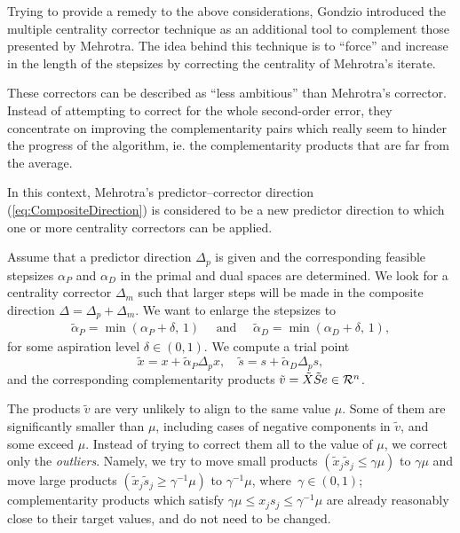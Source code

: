 Trying to provide a remedy to the above considerations, Gondzio 
\cite{Gondzio96} introduced the multiple centrality corrector technique 
as an additional tool to complement those presented by Mehrotra. 
The idea behind this technique is to ``force'' and increase in the 
length of the stepsizes by correcting the centrality of Mehrotra's 
iterate.

These correctors can be described as ``less ambitious'' than Mehrotra's
corrector. Instead of attempting to correct for the whole second-order error,
they concentrate on improving the complementarity pairs which really seem 
to hinder the progress of the algorithm, ie. the complementarity products 
that are far from the average.



In this context, Mehrotra's predictor--corrector direction 
(\ref{eq:CompositeDirection}) is considered to be a new predictor direction
to which one or more centrality correctors can be applied. 

Assume that a predictor direction $\Delta_p$ is given and the corresponding
feasible stepsizes $\alpha_{P}$ and $\alpha_{D}$ 
in the primal and dual spaces are 
determined. We look for a centrality corrector $\Delta_m$ such that larger
steps will be made in the composite direction $\Delta = \Delta_p + \Delta_m$.
We want to enlarge the stepsizes to 
%
\begin{eqnarray*} 
   \tilde{\alpha}_{P} = \min(\alpha_{P} \! + \! \delta, \,1) 
   \quad \mbox{ and } \quad
   \tilde{\alpha}_{D} = \min(\alpha_{D} \! + \! \delta, \,1), 
\end{eqnarray*}
%
for some aspiration level $\delta \in(0,1)$. We compute a trial point
%
\[
  \tilde{x} = x + \tilde{\alpha}_{P} \Delta_{p} x, \quad 
  \tilde{s} = s + \tilde{\alpha}_{D} \Delta_{p} s,
\]
%
and the corresponding complementarity products 
$\tilde v = \tilde X \tilde S e \in {\cal R}^{n}$.

The products $\tilde v$ are very unlikely to align to the same value $\mu$.
Some of them are significantly smaller than $\mu$, 
including cases of negative components in $\tilde v$, 
and some exceed $\mu$. Instead of trying to correct 
them all to the value of $\mu$, we correct only the {\it outliers}. 
Namely, we try to move small products 
$(\tilde x_j \tilde s_j \leq \gamma \mu)$ to $\gamma \mu$ and move 
large products $(\tilde x_j \tilde s_j \geq \gamma^{-1} \mu)$ 
to $\gamma^{-1} \mu$, where $\, \gamma \in (0,1)$;
complementarity products 
which satisfy $\gamma \mu \leq x_j s_j \leq \gamma^{-1} \mu$ are
already reasonably close to their target values, and 
do not need to be changed. 

